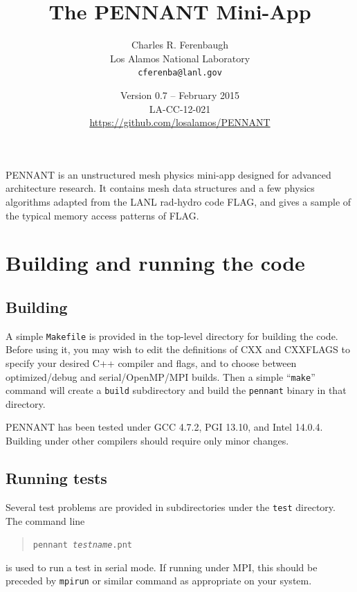 \documentclass[11pt,letterpaper]{article}
\begin{document}
\title{The PENNANT Mini-App}
\author{Charles R. Ferenbaugh \\
        Los Alamos National Laboratory \\
        {\tt cferenba@lanl.gov}}
\date{Version 0.7 -- February 2015 \\
      LA-CC-12-021 \\
      \url{https://github.com/losalamos/PENNANT}}
\maketitle

PENNANT is an unstructured mesh physics mini-app designed for advanced
architecture research.
It contains mesh data structures and a few physics algorithms adapted
from the LANL rad-hydro code FLAG, and gives a
sample of the typical memory access patterns of FLAG.


\section{Building and running the code}

\subsection{Building}

A simple {\tt Makefile} is provided in the top-level directory for building
the code.  Before using it, you may wish to edit the definitions of CXX
and CXXFLAGS to specify your desired C++ compiler and flags, and to
choose between optimized/debug and serial/OpenMP/MPI builds.  Then
a simple ``{\tt make}'' command will create a {\tt build} subdirectory and
build the {\tt pennant} binary in that directory.

PENNANT has been tested under GCC 4.7.2, PGI 13.10, and Intel 14.0.4.
Building under other compilers should require only minor changes.

\subsection{Running tests}

Several test problems are provided in subdirectories under the {\tt test}
directory.  The command line
\begin{quote}
{\tt pennant \emph{testname}.pnt}
\end{quote}
is used to run a test in serial mode.  If running under MPI, this should
be preceded by {\tt mpirun} or similar command as appropriate on your
system.
\end{document}
